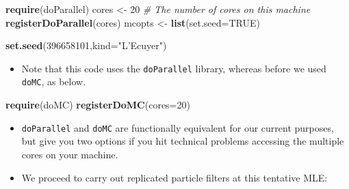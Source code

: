 \documentclass[]{article}
\newenvironment{Shaded}{\begin{snugshade}}{\end{snugshade}}
\newcommand{\KeywordTok}[1]{\textcolor[rgb]{0.13,0.29,0.53}{\textbf{#1}}}
\newcommand{\DataTypeTok}[1]{\textcolor[rgb]{0.13,0.29,0.53}{#1}}
\newcommand{\DecValTok}[1]{\textcolor[rgb]{0.00,0.00,0.81}{#1}}
\newcommand{\StringTok}[1]{\textcolor[rgb]{0.31,0.60,0.02}{#1}}
\newcommand{\CommentTok}[1]{\textcolor[rgb]{0.56,0.35,0.01}{\textit{#1}}}
\newcommand{\OtherTok}[1]{\textcolor[rgb]{0.56,0.35,0.01}{#1}}
\newcommand{\OperatorTok}[1]{\textcolor[rgb]{0.81,0.36,0.00}{\textbf{#1}}}
\newcommand{\NormalTok}[1]{#1}
\providecommand{\tightlist}{%
  \setlength{\itemsep}{0pt}\setlength{\parskip}{0pt}}
\begin{document}
\begin{Shaded}
\begin{Highlighting}[]
\KeywordTok{require}\NormalTok{(doParallel)}
\NormalTok{cores <-}\StringTok{ }\DecValTok{20}  \CommentTok{# The number of cores on this machine }
\KeywordTok{registerDoParallel}\NormalTok{(cores)}
\NormalTok{mcopts <-}\StringTok{ }\KeywordTok{list}\NormalTok{(}\DataTypeTok{set.seed=}\OtherTok{TRUE}\NormalTok{)}

\KeywordTok{set.seed}\NormalTok{(}\DecValTok{396658101}\NormalTok{,}\DataTypeTok{kind=}\StringTok{"L'Ecuyer"}\NormalTok{)}
\end{Highlighting}
\end{Shaded}

\begin{itemize}
\tightlist
\item
  Note that this code uses the \texttt{doParallel} library, whereas
  before we used \texttt{doMC}, as below.
\end{itemize}

\begin{Shaded}
\begin{Highlighting}[]
\KeywordTok{require}\NormalTok{(doMC)}
\KeywordTok{registerDoMC}\NormalTok{(}\DataTypeTok{cores=}\DecValTok{20}\NormalTok{) }
\end{Highlighting}
\end{Shaded}

\begin{itemize}
\item
  \texttt{doParallel} and \texttt{doMC} are functionally equivalent for
  our current purposes, but give you two options if you hit technical
  problems accessing the multiple cores on your machine.
\item
  We proceed to carry out replicated particle filters at this tentative
  MLE:
\end{itemize}

\begin{Shaded}
\end{Shaded}
\end{document}
